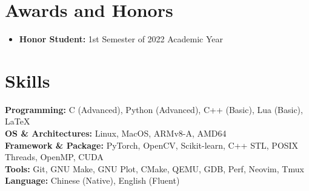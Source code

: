 \documentclass[a4paper,12pt]{article}
\begin{document}
\section{Awards and Honors}
\begin{itemize}[nosep,after=\strut, leftmargin=1em, itemsep=3pt]
  \item \textbf{Honor Student:} 1st Semester of 2022 Academic Year
\end{itemize}




\section{Skills}

\fontsize{10pt}{14pt}\selectfont
\noindent \textbf{Programming:} C (Advanced), Python (Advanced), C++ (Basic), Lua (Basic), \LaTeX \hspace{0.5cm} \\ [0.08cm]
\textbf{OS \& Architectures:} Linux, MacOS, ARMv8-A, AMD64  \\ [0.08cm]
\textbf{Framework \& Package:} PyTorch, OpenCV, Scikit-learn, C++ STL, POSIX Threads, OpenMP, CUDA \\ [0.08cm]
\textbf{Tools:} Git, GNU Make, GNU Plot, CMake, QEMU, GDB, Perf, Neovim, Tmux \\ [0.08cm]
\textbf{Language:} Chinese (Native), English (Fluent)

\vfill
{}
\end{document}
